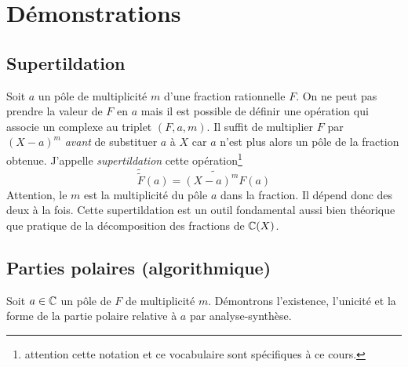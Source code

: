 \section{Démonstrations} \label{demo}
\subsection{Supertildation}
Soit $a$ un pôle de multiplicité $m$ d'une fraction rationnelle $F$. On ne peut pas prendre la valeur de $F$ en $a$ mais il est possible de définir une opération qui associe un complexe au triplet $(F,a,m)$. Il suffit de multiplier $F$ par $(X-a)^m$ \emph{avant} de substituer $a$ à $X$ car $a$ n'est plus alors un pôle de la fraction obtenue. 
J'appelle \emph{supertildation} cette opération\footnote{attention cette notation et ce vocabulaire sont spécifiques à ce cours.}
\begin{displaymath}
 \widetilde{\widetilde{F}}(a) = \widetilde{(X-a)^mF}(a)
\end{displaymath}
Attention, le $m$ est la multiplicité du pôle $a$ dans la fraction. Il dépend donc des deux à la fois. Cette supertildation est un outil fondamental aussi bien théorique que pratique de la décomposition des fractions de $\mathbb{C}(X)$.

\subsection{Parties polaires (algorithmique)} \label{ppol}
Soit $a\in \mathbb{C}$ un pôle de $F$ de multiplicité $m$. Démontrons l'existence, l'unicité et la forme de la partie polaire relative à $a$ par analyse-synthèse.

